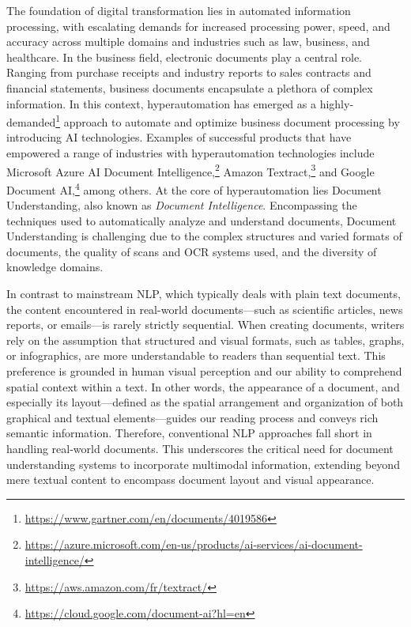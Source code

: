 The foundation of digital transformation lies in automated information processing, with escalating demands for increased processing power, speed, and accuracy across multiple domains and industries such as law, business, and healthcare. In the business field, electronic documents play a central role. Ranging from purchase receipts and industry reports to sales contracts and financial statements, business documents encapsulate a plethora of complex information. In this context, hyperautomation has emerged as a highly-demanded\footnote{\url{https://www.gartner.com/en/documents/4019586}} approach to automate and optimize business document processing by introducing \ac{AI} technologies. Examples of successful products that have empowered a range of industries with hyperautomation technologies include Microsoft Azure AI Document Intelligence,\footnote{\url{https://azure.microsoft.com/en-us/products/ai-services/ai-document-intelligence/}} Amazon Textract,\footnote{\url{https://aws.amazon.com/fr/textract/}} and Google Document AI,\footnote{\url{https://cloud.google.com/document-ai?hl=en}} among others. At the core of hyperautomation lies Document Understanding, also known as \textit{Document Intelligence}. Encompassing the techniques used to automatically analyze and understand documents, Document Understanding is challenging due to the complex structures and varied formats of documents, the quality of scans and \ac{OCR} systems used, and the diversity of knowledge domains.

In contrast to mainstream \ac{NLP}, which typically deals with plain text documents, the content encountered in real-world documents—such as scientific articles, news reports, or emails—is rarely strictly sequential. When creating documents, writers rely on the assumption that structured and visual formats, such as tables, graphs, or infographics, are more understandable to readers than sequential text. This preference is grounded in human visual perception and our ability to comprehend spatial context within a text. In other words, the appearance of a document, and especially its layout—defined as the spatial arrangement and organization of both graphical and textual elements—guides our reading process and conveys rich semantic information. Therefore, conventional \ac{NLP} approaches fall short in handling real-world documents. This underscores the critical need for document understanding systems to incorporate multimodal information, extending beyond mere textual content to encompass document layout and visual appearance.

